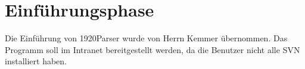 \section{Einführungsphase}
\label{sec:Einfuehrungsphase}
Die Einführung von 1920Parser wurde von Herrn Kemmer übernommen. Das Programm soll im Intranet bereitgestellt werden, da die Benutzer nicht alle \ac{SVN} installiert haben.

